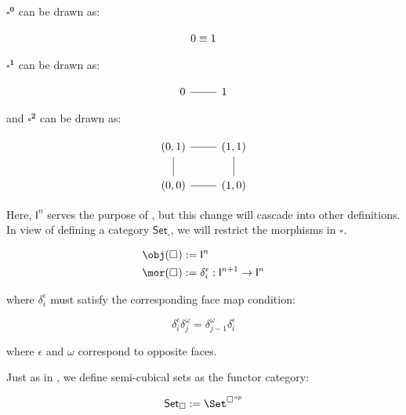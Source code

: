 \documentclass[10pt]{art.cls/art}
\newcommand{\Cube}[1]{\ensuremath{\boldsymbol{\square^{#1}}}}
\renewcommand{\I}[1]{\ensuremath{\mathsf{I}^{#1}}}
\newcommand{\CSet}{\ensuremath{\mathsf{Set}_{\boldsymbol{\square}}}}
\begin{document}
\begin{example}[$\Cube{0}$, $\Cube{1}$ and $\Cube{2}$]
  $\Cube{0}$ can be drawn as:

  $$
    \begin{tikzcd}
      0 \equiv 1
    \end{tikzcd}
  $$

  $\Cube{1}$ can be drawn as:

  \begin{equation*}
    \begin{tikzcd}
      0 \arrow[r, dash] & 1
    \end{tikzcd}
  \end{equation*}


  and $\Cube{2}$ can be drawn as:


  \begin{equation*}
    \begin{tikzcd}
      (0, 1) \arrow[r, dash] & (1, 1) \arrow[d, dash] \\
      (0, 0) \arrow[u, dash] & (1, 0) \arrow[l, dash]
    \end{tikzcd}
  \end{equation*}
\end{example}

Here, $\I{n}$ serves the purpose of , but this change will cascade into other definitions. In view of defining a category \CSet, we will restrict the morphisms in \Cube{}.

\begin{definition}[\Cube{}]
  \begin{align*}
    \obj(\Cube{}) & := \I{n}                                           \\
    \mor(\Cube{}) & := \delta^\epsilon_i : \I{n + 1} \rightarrow \I{n}
  \end{align*}

  where $\delta^\epsilon_i$ must satisfy the corresponding face map condition:

  \begin{equation*}
    \delta^\epsilon_i \delta^\omega_j = \delta^\omega_{j - 1} \delta^\epsilon_i
  \end{equation*}

  where $\epsilon$ and $\omega$ correspond to opposite faces.
\end{definition}

\begin{definition}[\CSet]
  Just as in \SSet, we define semi-cubical sets as the functor category:

  \begin{equation*}
    \CSet := \Set^{\Cube{}^{op}}
  \end{equation*}
\end{definition}
\end{document}
